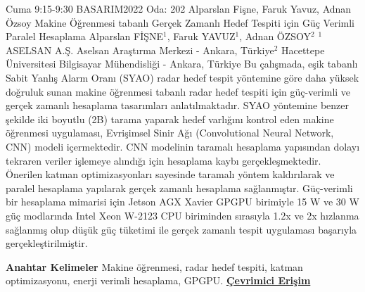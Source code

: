 
    \begin{abstract_basarim}
    {Cuma 9:15-9:30}
    {BASARIM2022}
    {Oda: 202}
    {Alparslan Fişne, Faruk Yavuz, Adnan Özsoy}
    {Makine Öğrenmesi tabanlı Gerçek Zamanlı Hedef Tespiti için Güç Verimli Paralel Hesaplama}
    {%
    Alparslan FİŞNE$^{1}$, Faruk YAVUZ$^{1}$, Adnan ÖZSOY$^{2}$}
    {%
    }
    {%
    $^1$ ASELSAN A.Ş. Aselsan Araştırma Merkezi - Ankara, Türkiye\newline{}$^2$ Hacettepe Üniversitesi Bilgisayar Mühendisliği - Ankara, Türkiye}
    Bu çalışmada, eşik tabanlı Sabit Yanlış Alarm Oranı (SYAO) radar hedef tespit yöntemine göre daha yüksek doğruluk sunan makine öğrenmesi tabanlı radar hedef tespiti için güç-verimli ve gerçek zamanlı hesaplama tasarımları anlatılmaktadır. SYAO yöntemine benzer şekilde iki boyutlu (2B) tarama yaparak hedef varlığını kontrol eden makine öğrenmesi uygulaması, Evrişimsel Sinir Ağı (Convolutional Neural Network, CNN) modeli içermektedir. CNN modelinin taramalı hesaplama yapısından dolayı tekraren veriler işlemeye alındığı için hesaplama kaybı gerçekleşmektedir. Önerilen katman optimizasyonları sayesinde taramalı yöntem kaldırılarak ve paralel hesaplama yapılarak gerçek zamanlı hesaplama sağlanmıştır. Güç-verimli bir hesaplama mimarisi için Jetson AGX Xavier GPGPU birimiyle 15 W ve 30 W güç modlarında Intel Xeon W-2123 CPU biriminden sırasıyla 1.2x ve 2x hızlanma sağlanmış olup düşük güç tüketimi ile gerçek zamanlı tespit uygulaması başarıyla gerçekleştirilmiştir. 
    
            \textbf{Anahtar Kelimeler} \newline{}Makine öğrenmesi, radar hedef tespiti, katman optimizasyonu, enerji verimli hesaplama, GPGPU.
     \newline\newline\noindent \href{https://drive.google.com/file/d/1oPFwlb9nyBeN2SLv5RJ7jUYcpjFTPqsG/view?usp=drivesdk}{\bfseries Çevrimici Erişim}
    \end{abstract_basarim}
    